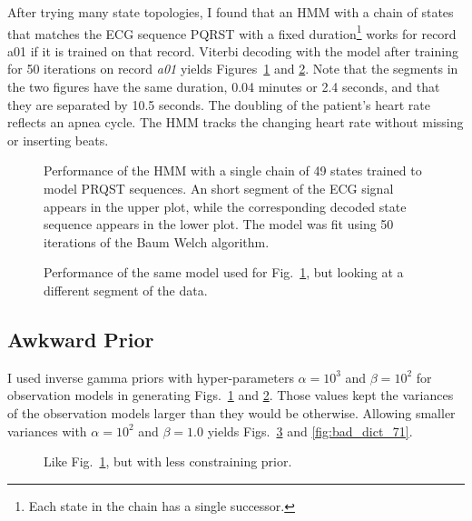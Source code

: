 \documentclass[12pt]{article}
\begin{document}
After trying many state topologies, I found that an HMM with a chain
of states that matches the ECG sequence PQRST with a fixed
duration\footnote{Each state in the chain has a single successor.}
works for record a01 if it is trained on that record.  Viterbi
decoding with the model after training for 50 iterations on record
\emph{a01} yields Figures~\ref{fig:dict_states_70} and
\ref{fig:dict_states_71}.  Note that the segments in the two figures
have the same duration, 0.04 minutes or 2.4 seconds, and that they are
separated by 10.5 seconds.  The doubling of the patient's heart rate
reflects an apnea cycle.  The HMM tracks the changing heart rate
without missing or inserting beats.

\begin{figure}
  \centering
    \caption{Performance of the HMM with a single chain of 49 states
      trained to model PRQST sequences.  An short segment of the ECG
      signal appears in the upper plot, while the corresponding
      decoded state sequence appears in the lower plot.  The model was
      fit using 50 iterations of the Baum Welch algorithm.}
  \label{fig:dict_states_70}
\end{figure}

\begin{figure}
  \centering
  \caption{Performance of the same model used for
    Fig.~\ref{fig:dict_states_70}, but looking at a different
    segment of the data.}
  \label{fig:dict_states_71}
\end{figure}

\subsection{Awkward Prior}
\label{sec:awkward}

I used inverse gamma priors with hyper-parameters $\alpha=10^3$ and
$\beta=10^2$ for observation models in generating
Figs.~\ref{fig:dict_states_70} and \ref{fig:dict_states_71}.  Those
values kept the variances of the observation models larger than they
would be otherwise.  Allowing smaller variances with $\alpha=10^2$ and
$\beta=1.0$ yields Figs.~\ref{fig:bad_dict_70} and
\ref{fig:bad_dict_71}.

\begin{figure}
  \centering
    \caption{Like Fig.~\ref{fig:dict_states_70}, but with less
      constraining prior.}
  \label{fig:bad_dict_70}
\end{figure}
\end{document}
